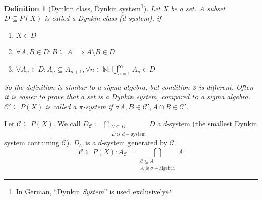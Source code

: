\documentclass{article}
\newtheorem{definition}{Definition}  \numberwithin{definition}{section}
\begin{document}
\begin{definition}[Dynkin class, Dynkin system\footnote{In German, \enquote{Dynkin \emph{System}} is used exclusively}]
  Let $X$ be a set. A subset $D \subseteq P(X)$ is called a Dynkin class (d-system), if
  \begin{enumerate}
    \item $X \in D$
    \item $\forall A,B \in D: B \subseteq A \implies A \setminus B \in D$
    \item $\forall A_n \in D: A_n \subseteq A_{n+1}, \forall n \in \mathbb N: \bigcup_{n=1}^\infty A_n \in D$
  \end{enumerate}
  So the definition is similar to a sigma algebra, but condition 3 is different.
  Often it is easier to prove that a set is a Dynkin system, compared to a sigma algebra.
  $\mathcal C' \subseteq P(X)$ is called a $\pi$-system if $\forall A, B \in \mathcal C', A \cap B \in \mathcal C'$.
\end{definition}

Let $\mathcal C \subseteq P(X)$. We call $D_{\mathcal C} \coloneqq \bigcap_{\substack{\mathcal C \subseteq D \\ D \text{ is } d-\text{system}}} D$ a $d$-system (the smallest Dynkin system containing $\mathcal C$).
$D_{\mathcal C}$ is a $d$-system generated by $\mathcal C$.
\[ \mathcal C \subseteq P(X): A_{\mathcal C} = \bigcap_{\substack{\mathcal C \subseteq A \\ A \text{ is } \sigma-\text{algebra}}} A \]
\end{document}
